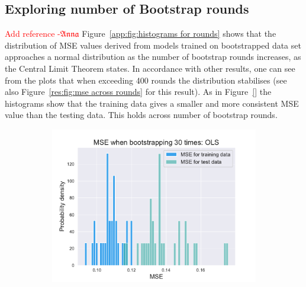 \documentclass[twocolumn,english,notitlepage]{article}
\newcommand{\comment}[1]{\textcolor{red}{#1}}
\newcommand{\Anna}{$\mathfrak{Anna}$}
\begin{document}
\begin{appendices}
    \section{Exploring number of Bootstrap rounds} \label{app:sec:BS rounds}
        \comment{Add reference -\Anna}
         Figure~\ref{app:fig:histograms for rounds} shows that the distribution of MSE values derived from models trained on bootstrapped data set approaches a normal distribution as the number of bootstrap rounds increases, as the Central Limit Theorem states. In accordance with other results, one can see from the plots that when exceeding 400 rounds the distribution stabilises (see also Figure~\ref{res:fig:mse across rounds} for this result). As in Figure~\ref{} the histograms show that the training data gives a smaller and more consistent MSE value than the testing data. This holds across number of bootstrap rounds.
        \begin{figure}
            \begin{subfigure}{.5\textwidth}
                \centering
                \includegraphics[width=\linewidth]{BS_hist_bootstraped_30_rounds_of_degree_7.pdf}
                \caption{}
                \label{app:fig:histograms for rounds:30}
                \end{subfigure}
            \hfill
            \begin{subfigure}{.5\textwidth}
                \centering

\end{subfigure}
\end{figure}
\end{appendices}
\end{document}
